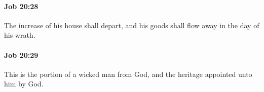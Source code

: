 		\paragraph{Job 20:28} %
			\label{JOB-20-28}

			The increase of his house shall depart, and his goods shall flow away in the day of his wrath.


		\paragraph{Job 20:29} %
			\label{JOB-20-29}

			This is the portion of a wicked man from God, and the heritage appointed unto him by God.


